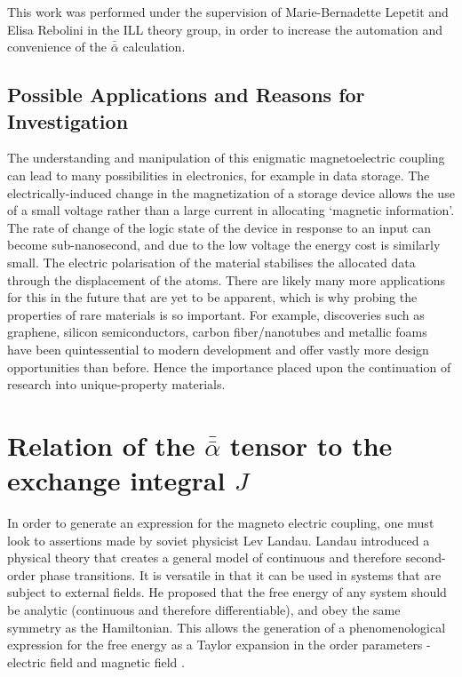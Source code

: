 \documentclass[10pt]{article}
\begin{document}
This work was performed under the supervision of Marie-Bernadette Lepetit and Elisa Rebolini in the ILL theory group, in order to increase the automation and convenience of the $\bar{\bar{\alpha}}$ calculation.

\subsection{Possible Applications and Reasons for Investigation}

The understanding and manipulation of this enigmatic magnetoelectric coupling can lead to many possibilities in electronics, for example in data storage. The electrically-induced change in the magnetization of a storage device allows the use of a small voltage rather than a large current in allocating `magnetic information'. The rate of change of the logic state of the device in response to an input can become sub-nanosecond, and due to the low voltage the energy cost is similarly small. The electric polarisation of the material stabilises the allocated data through the displacement of the atoms. There are likely many more applications for this in the future that are yet to be apparent, which is why probing the properties of rare materials is so important. For example, discoveries such as graphene, silicon semiconductors, carbon fiber/nanotubes and metallic foams have been quintessential to modern development and offer vastly more design opportunities than before. Hence the importance placed upon the continuation of research into unique-property materials.   

\section{Relation of the $\bar{\bar{\alpha}}$ tensor to the exchange integral $J$}

In order to generate an expression for the magneto electric coupling, one must look to assertions made by soviet physicist Lev Landau. Landau introduced a physical theory that creates a general model of continuous and therefore second-order phase transitions. It is versatile in that it can be used in systems that are subject to external fields. He proposed that the free energy of any system should be analytic (continuous and therefore differentiable), and obey the same symmetry as the Hamiltonian. This allows the generation of a phenomenological expression for the free energy as a Taylor expansion in the order parameters - electric field and magnetic field \cite{landau1936theory}.
\end{document}
